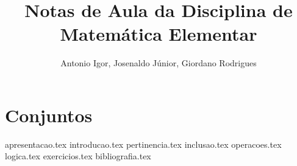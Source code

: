 \documentclass[a4paper,12pt, oneside]{book}
\begin{document}
    \nocite{*}
    \title{Notas de Aula da Disciplina de Matemática Elementar} 
    \author{Antonio Igor, Josenaldo Júnior, Giordano Rodrigues} 

    \frontmatter %
    \maketitle
    \tableofcontents

    \mainmatter %

    \chapter{Conjuntos}
    {apresentacao.tex}
    {introducao.tex}
    {pertinencia.tex}
    {inclusao.tex}
    {operacoes.tex}
    {logica.tex}
    {exercicios.tex}
    {bibliografia.tex} %
\end{document}
